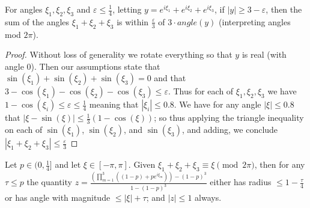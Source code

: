 \documentclass[11pt]{article}
\theoremstyle{plain}
\newcommand{\eps}{\varepsilon}
\begin{document}
\begin{lemma}\label{lem:close-angle}
For angles $\xi_1,\xi_2,\xi_3$ and $\eps \leq \frac{1}{4}$, letting $y=e^{i\xi_1}+e^{i\xi_2}+e^{i\xi_3}$, if $|y|\geq 3-\eps$, then the sum of the angles $\xi_1+\xi_2+\xi_3$ is within $\frac{\eps}{3}$ of $3\cdot angle(y)$ (interpreting angles mod $2\pi$).
\end{lemma}
\begin{proof}
Without loss of generality we rotate everything so that $y$ is real (with angle 0). Then our assumptions state that $\sin(\xi_1)+\sin(\xi_2)+\sin(\xi_3)=0$ and that $3-\cos(\xi_1)-\cos(\xi_2)-\cos(\xi_3)\leq \eps$. Thus for each of $\xi_1,\xi_2,\xi_3$ we have $1-\cos(\xi_i)\leq \eps\leq\frac{1}{4}$ meaning that $|\xi_i|\leq 0.8$. We have for any angle $|\xi|\leq 0.8$ that $|\xi-\sin(\xi)|\leq \frac{1}{3}(1-\cos(\xi))$; so thus applying the triangle inequality on each of $\sin(\xi_1)$, $\sin(\xi_2)$, and $\sin(\xi_3)$, and adding, we conclude $|\xi_1+\xi_2+\xi_3|\leq \frac{\eps}{3}$
\end{proof}
\begin{lemma}\label{lem:low-frequency-or-decay}
Let $p\in(0,\frac{1}{4}]$ and let $\xi\in[-\pi,\pi]$. Given $\xi_1+\xi_2+\xi_3\equiv \xi \pmod{2\pi}$, then for any $\tau\leq p$  the quantity $z=\frac{\left(\prod_{m=1}^3((1-p)+p e^{i \xi_m})\right)-(1-p)^3}{1-(1-p)^3}$ either has radius $\leq 1-\frac{\tau}{4}$ or has angle with magnitude $\leq |\xi|+\tau$; and $|z|\leq 1$ always.
\end{lemma}
\end{document}
